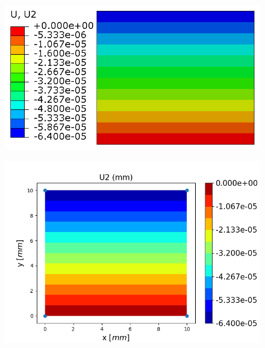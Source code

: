 \documentclass[12pt]{article}
\begin{document}
\begin{figure}[H]
	\centering
	\begin{minipage}{.5\textwidth}
		\centering
		\includegraphics[width=1\linewidth]{M1U2.png}
		\label{M1U2}
	\end{minipage}%
	\begin{minipage}{.55\textwidth}
		\centering
		\includegraphics[width=1\linewidth]{M1U2_IGA.png}
		\label{M1U2_IGA}
	\end{minipage}
\end{figure}
\end{document}
